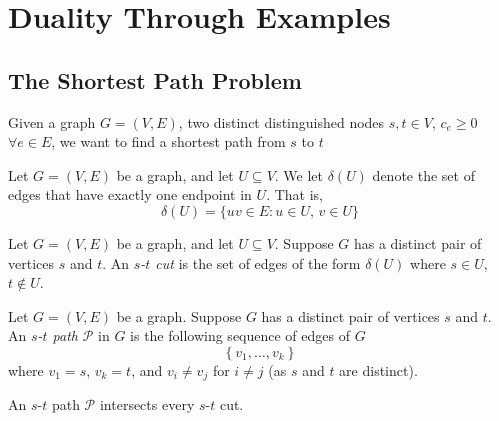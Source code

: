 \chapter{Duality Through Examples}
\section{The Shortest Path Problem}
Given a graph $ G=(V,E) $, two distinct distinguished nodes $ s,t\in V $,
$ c_e\geqslant  0 $ $ \forall e\in E $, we want to find a shortest path from $s$ to $t$

\begin{defbox}
    \begin{definition}
        Let $ G=(V,E) $ be a graph, and let $ U\subseteq V $. We
        let $ \delta(U) $ denote the set of edges that have exactly
        one endpoint in $ U $. That is,
        \[ \delta(U)=\{uv\in E:u\in U,\,v\in U\} \]
    \end{definition}
\end{defbox}

\begin{defbox}
    \begin{definition}
        Let $ G=(V,E) $ be a graph, and let $ U\subseteq V $.
        Suppose $ G $ has a distinct pair of vertices $ s $ and $ t $.
        An \emph{$s$-$t$ cut} is the set of edges of the form $ \delta(U) $
        where $ s\in U $, $ t\notin U $.
    \end{definition}
\end{defbox}

\begin{defbox}
    \begin{definition}
        Let $ G=(V,E) $ be a graph. Suppose $ G $ has a distinct pair of vertices $ s $ and $ t $.
        An \emph{$s$-$t$ path} $\mathcal{P}$ in $ G $ is the following sequence of edges of $G$
        \[ \left\{v_1,\ldots,v_{k}\right\} \]
        where $ v_1=s $, $ v_k=t $, and $ v_i\neq v_j $ for $ i\neq j $
        (as $ s $ and $ t $ are distinct).
    \end{definition}
\end{defbox}

\begin{thmbox}
    \begin{theorem}
        An $s$-$t$ path $ \mathcal{P} $ intersects every $s$-$t$ cut.
    \end{theorem}
\end{thmbox}

